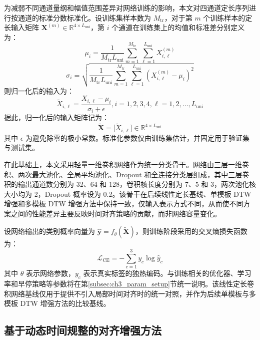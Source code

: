 \documentclass{xdupgthesis}
\begin{document}
为减弱不同通道量纲和幅值范围差异对网络训练的影响，本文对四通道定长序列进行按通道的标准分数标准化。设训练集样本数为 $M_{\mathrm{tr}}$，对于第 $m$ 个训练样本的定长输入矩阵 $\mathbf{X}^{(m)}\in\mathbb{R}^{4\times L_{\mathrm{uni}}}$，第 $i$ 个通道在训练集上的均值和标准差分别定义为：
\begin{equation}
    \mu_i=\frac{1}{M_{\mathrm{tr}}L_{\mathrm{uni}}}
    \sum_{m=1}^{M_{\mathrm{tr}}}\sum_{\ell=1}^{L_{\mathrm{uni}}}X_{i,\ell}^{(m)}
\end{equation}
\begin{equation}
    \sigma_i=
    \sqrt{
    \frac{1}{M_{\mathrm{tr}}L_{\mathrm{uni}}}
    \sum_{m=1}^{M_{\mathrm{tr}}}\sum_{\ell=1}^{L_{\mathrm{uni}}}
    \left(X_{i,\ell}^{(m)}-\mu_i\right)^2}
\end{equation}
则归一化后的输入为：
\begin{equation}
    \tilde{X}_{i,\ell}=\frac{X_{i,\ell}-\mu_i}{\sigma_i+\epsilon}, i=1,2,3,4, \ell=1,2,\ldots,L_{\mathrm{uni}}
\end{equation}
据此，归一化后的输入矩阵记为：
\begin{equation}
    \tilde{\mathbf{X}}=\big[\tilde{X}_{i,\ell}\big]\in\mathbb{R}^{4\times L_{\mathrm{uni}}}
\end{equation}
其中 $\epsilon$ 为避免除零的极小常数。标准化参数仅由训练集估计，并固定用于验证集与测试集。

在此基础上，本文采用轻量一维卷积网络作为统一分类骨干。网络由三层一维卷积、两次最大池化、全局平均池化、Dropout 和全连接分类层组成，其中三层卷积的输出通道数分别为 32、64 和 128，卷积核长度分别为 7、5 和 3，两次池化核大小均为 2，Dropout 概率设为 0.2。该骨干在后续线性定长基线、单模板 DTW 增强和多模板 DTW 增强方法中保持一致，仅输入表示方式不同，从而使不同方案之间的性能差异主要反映时间对齐策略的贡献，而非网络容量变化。

设网络输出的类别概率向量为 $\hat{\mathbf{y}}=f_{\theta}(\tilde{\mathbf{X}})$，则训练阶段采用的交叉熵损失函数为：
\begin{equation}
    \mathcal{L}_{\mathrm{CE}}=-\sum_{c=1}^{3} y_c \log \hat{y}_c
\end{equation}
其中 $\theta$ 表示网络参数，$y_c$ 表示真实标签的独热编码。与训练相关的优化器、学习率和早停策略等参数将在第\ref{subsec:ch3_param_setup}节统一说明。该线性定长卷积网络基线仅用于提供不引入局部时间对齐时的统一对照，并作为后续单模板与多模板 DTW 增强方法的比较基线。

\subsection{基于动态时间规整的对齐增强方法}
\label{subsec:ch3_dtw_def}
\end{document}
